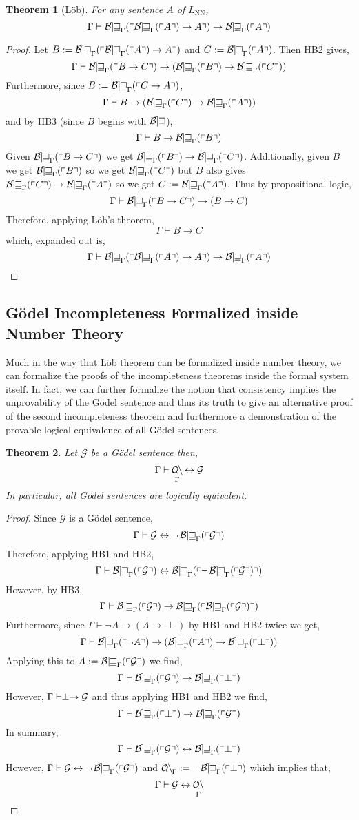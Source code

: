 \documentclass[12pt, leqno]{article}
\newcommand{\proves}{\vdash}
\theoremstyle{theorem}
\newtheorem{theorem}{Theorem}[section]
\theoremstyle{definition}
\theoremstyle{definition}
\theoremstyle{remark}
\theoremstyle{definition}
\theoremstyle{remark}
\DeclareMathOperator{\Bew}{\mathcal{B\mkern-2.0mu e\mkern-2.0mu w\mkern-1mu}}
\DeclareMathOperator{\Con}{\mathcal{C\mkern-3mu o\mkern-1mu n\mkern-1.5mu}}
\begin{document}
\begin{theorem}[L\"{o}b] 
For any sentence $A$ of $L_{\mathrm{NN}}$,
\[ \Gamma \proves \Thm{\Thm{A} \to A} \to \Thm{A} \]
\end{theorem}

\begin{proof}
Let $B := \Thm{\Thm{A} \to A}$ and $C := \Thm{A}$. Then HB2 gives,
\[ \Gamma \proves \Thm{B \to C} \to (\Thm{B} \to \Thm{C}) \]
Furthermore, since $B := \Thm{C \to A}$,
\[ \Gamma \proves B \to (\Thm{C} \to \Thm{A}) \]
and by HB3 (since $B$ begins with $\Bew$),
\[ \Gamma \proves B \to \Thm{B} \]
Given $\Thm{B \to C}$ we get $\Thm{B} \to \Thm{C}$. Additionally, given $B$ we get $\Thm{B}$ so we get $\Thm{C}$ but $B$ also gives $\Thm{C} \to \Thm{A}$ so we get $C := \Thm{A}$. Thus by propositional logic,
\[ \Gamma \proves \Thm{B \to C} \to (B \to C) \]
Therefore, applying L\"{o}b's theorem,
\[ \Gamma \proves B \to C \]
which, expanded out is,
\[ \Gamma \proves \Thm{\Thm{A} \to A} \to \Thm{A} \]
\end{proof}

\subsection{G\"{o}del Incompleteness Formalized inside Number Theory}

Much in the way that L\"{o}b theorem can be formalized inside number theory, we can formalize the proofs of the incompleteness theorems inside the formal system itself. In fact, we can further formalize the notion that consistency implies the unprovability of the G\"{o}del sentence and thus its truth to give an alternative proof of the second incompleteness theorem and furthermore a demonstration of the provable logical equivalence of all G\"{o}del sentences.  

\begin{theorem}
Let $\mathcal{G}$ be a G\"{o}del sentence then,
\[ \Gamma \proves \Con_{\Gamma} \leftrightarrow \mathcal{G} \]
In particular, all G\"{o}del sentences are logically equivalent. 
\end{theorem}

\begin{proof}
Since $\mathcal{G}$ is a G\"{o}del sentence,
\[ \Gamma \proves \mathcal{G} \leftrightarrow \neg \Thm{\mathcal{G}} \]
Therefore, applying HB1 and HB2,
\[ \Gamma \proves \Thm{\mathcal{G}} \leftrightarrow \Thm{\neg \Thm{\mathcal{G}}} \]
However, by HB3,
\[ \Gamma \proves \Thm{\G} \to \Thm{\Thm{\G}} \] 
Furthermore, since $\Gamma \proves \neg A \to (A \to \perp)$  by HB1 and HB2 twice we get,
\[ \Gamma \proves \Thm{\neg A} \to (\Thm{A} \to \Thm{\perp}) \]
Applying this to $A := \Thm{\G}$ we find,
\[ \Gamma \proves \Thm{\G} \to \Thm{\perp} \]
However, $\Gamma \proves \perp \to \G$ and thus applying HB1 and HB2 we find,
\[ \Gamma \proves \Thm{\perp} \to \Thm{\G} \]
In summary,
\[ \Gamma \proves \Thm{\G} \leftrightarrow \Thm{\perp} \]
However, $\Gamma \proves \G \leftrightarrow \neg \Thm{\G}$ and $\Con_{\Gamma} := \neg \Thm{\perp}$ which implies that,
\[ \Gamma \proves \G \leftrightarrow \Con_{\Gamma} \]
\end{proof}
\end{document}

